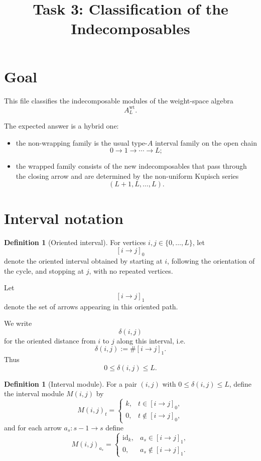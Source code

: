 \documentclass{article}
\title{Task 3: Classification of the Indecomposables}
\date{}
\theoremstyle{definition}
\newtheorem{definition}[theorem]{Definition}
\begin{document}
\maketitle

\section{Goal}

This file classifies the indecomposable modules of the weight-space algebra
\[
A_L^{\mathrm{wt}}.
\]

The expected answer is a hybrid one:

\begin{itemize}
\item the non-wrapping family is the usual type-$A$ interval family on the open
  chain
  \[
  0\to 1\to \cdots \to L;
  \]
\item the wrapped family consists of the new indecomposables that pass through
  the closing arrow and are determined by the non-uniform Kupisch series
  \[
  (L+1,L,\dots,L).
  \]
\end{itemize}

\section{Interval notation}

\begin{definition}[Oriented interval]
For vertices $i,j\in\{0,\dots,L\}$, let
\[
[i\to j]_0
\]
denote the oriented interval obtained by starting at $i$, following the
orientation of the cycle, and stopping at $j$, with no repeated vertices.

Let
\[
[i\to j]_1
\]
denote the set of arrows appearing in this oriented path.

We write
\[
\delta(i,j)
\]
for the oriented distance from $i$ to $j$ along this interval, i.e.
\[
\delta(i,j):=\# [i\to j]_1.
\]
Thus
\[
0\le \delta(i,j)\le L.
\]
\end{definition}

\begin{definition}[Interval module]
For a pair $(i,j)$ with $0\le \delta(i,j)\le L$, define the interval module
$M(i,j)$ by
\[
M(i,j)_t
=
\begin{cases}
k, & t\in [i\to j]_0,\\
0, & t\notin [i\to j]_0,
\end{cases}
\]
and for each arrow $a_s:s-1\to s$ define
\[
M(i,j)_{a_s}
=
\begin{cases}
\mathrm{id}_k, & a_s\in [i\to j]_1,\\
0, & a_s\notin [i\to j]_1.
\end{cases}
\]
\end{definition}
\end{document}
